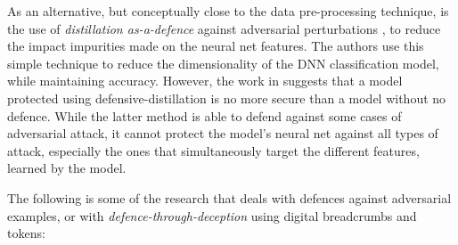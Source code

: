 \documentclass[grad,lot,lof,11pt,oneside,onehalfspace]{RUthesis}
\begin{document}
As an alternative, but conceptually close to the data pre-processing technique, is the use of \textit{distillation as-a-defence} against adversarial perturbations \cite{papernot_distillation_2016}, to reduce the impact impurities made on the neural net features. The authors use this simple technique to reduce the dimensionality of the DNN classification model, while maintaining accuracy.  However, the work in \cite{carlini_defensive_nodate} suggests that a model protected using defensive-distillation is no more secure than a model without no defence. While the latter method is able to defend against some cases of adversarial attack, it cannot protect the model's neural net against all types of attack, especially the ones that simultaneously target the different features, learned by the model.

The following is some of the research that deals  with defences against adversarial examples, or with \textit{defence-through-deception} using digital breadcrumbs and tokens:
\renewcommand{\theenumi}{\roman{enumi}}%
\end{document}
